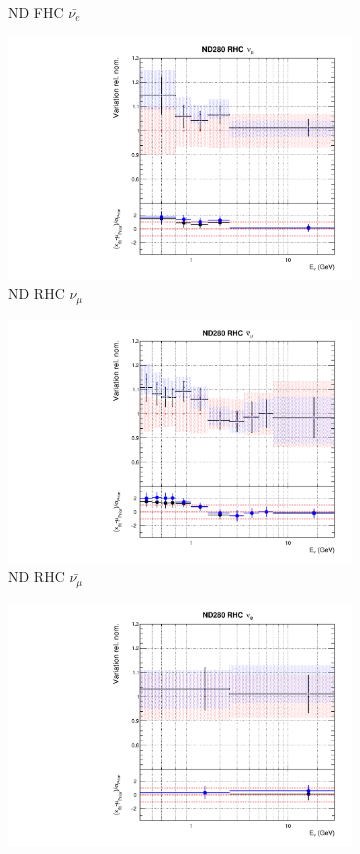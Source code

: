 \begin{figure}
\begin{subfigure}{0.45\textwidth}
  \caption{ND FHC $\bar{\nu_{e}}$}
\end{subfigure}
\begin{subfigure}{0.45\textwidth}
  \centering
  \includegraphics[width=0.75\linewidth]{figs/comp5q2vs8q2flux4}
  \caption{ND RHC $\nu_{\mu}$}
\end{subfigure}
\begin{subfigure}{0.45\textwidth}
  \centering
  \includegraphics[width=0.75\linewidth]{figs/comp5q2vs8q2flux5}
  \caption{ND RHC $\bar{\nu_{\mu}}$}
\end{subfigure}
\begin{subfigure}{0.45\textwidth}
  \centering
  \includegraphics[width=0.75\linewidth]{figs/comp5q2vs8q2flux6}

\end{subfigure}
\end{figure}
